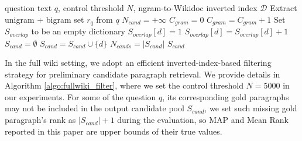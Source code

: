 \begin{algorithm}
    \small
        \caption{Inverted Index Filtering Strategy}
        \label{algo:fullwiki_filter}
    \begin{algorithmic}
         question text $q$, control threshold $N$, ngram-to-Wikidoc inverted index $\mathcal{D}$
            \STATE Extract unigram + bigram set $r_q$ from $q$
            \STATE $N_{cand} = +\infty$
            \STATE $C_{gram} = 0$
            \STATE $C_{gram} = C_{gram} + 1$
            \STATE Set $S_{overlap}$ to be an empty dictionary
                           \STATE $S_{overlap}[d] = 1$
                      \ELSE
                           \STATE $S_{overlap}[d] = S_{overlap}[d] + 1$
                      \ENDIF
                 \ENDFOR
            \ENDFOR
            \STATE $S_{cand} = \emptyset$
                    \STATE $S_{cand} = S_{cand} \cup \{d\}$
                \ENDIF
            \ENDFOR
            \STATE $N_{cands} = |S_{cand}|$
        \ENDWHILE
        \RETURN $S_{cand}$
    \end{algorithmic}
    \end{algorithm}
In the full wiki setting, we adopt an efficient
inverted-index-based filtering strategy for preliminary
candidate paragraph retrieval. We provide details in Algorithm \ref{algo:fullwiki_filter}, where
we set the control threshold $N = 5000$ in our experiments.
For some of the question $q$, its corresponding gold paragraphs may not
be included in the output candidate pool $S_{cand}$,
we set such missing gold paragraph's rank as $|S_{cand}| + 1$ during the evaluation, so
MAP and Mean Rank reported in this paper are upper bounds of their true values.

